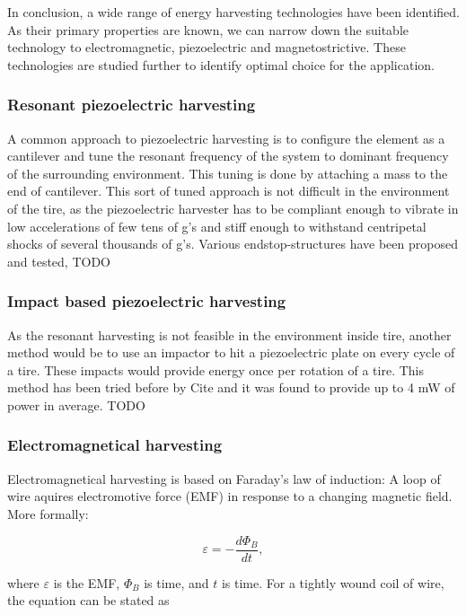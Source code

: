 In conclusion, a wide range of energy harvesting technologies have been identified. As their primary properties are known, we can narrow down the suitable technology to electromagnetic, piezoelectric and magnetostrictive. These technologies are studied further to identify optimal choice for the application.

\subsubsection{Resonant piezoelectric harvesting}
A common approach to piezoelectric harvesting is to configure the element as a cantilever and tune the resonant frequency of the system to dominant frequency of the surrounding environment. This tuning is done by attaching a mass to the end of cantilever. This sort of tuned approach is not difficult in the environment of the tire, as the piezoelectric harvester has to be compliant enough to vibrate in low accelerations of few tens of g's and stiff enough to withstand centripetal shocks of several thousands of g's. Various endstop-structures have been proposed and tested, TODO



\subsubsection{Impact based piezoelectric harvesting}
As the resonant harvesting is not feasible in the environment inside tire, another method would be to use an impactor to hit a piezoelectric plate on every cycle of a tire. These impacts would provide energy once per rotation of a tire. This method has been tried before by {\color{red} Cite} and it was found to provide up to 4 mW of power in average. TODO



\subsubsection{Electromagnetical harvesting}
Electromagnetical harvesting is based on Faraday's law of induction: A loop of wire aquires electromotive force (EMF) in response to a changing magnetic field. More formally:

\begin{equation}
  \varepsilon = - \frac{d \Phi_ {B}}{d t} , 
\end{equation}

where $\varepsilon$ is the EMF, $\Phi_{B}$ is time, and $t$ is time. For a tightly wound coil of wire, the equation can be stated as 

